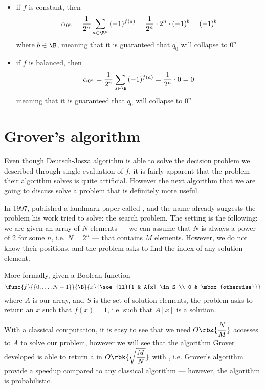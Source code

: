 \documentclass[a4paper, 12pt]{report}
\begin{document}
\begin{itemize}
    \item if $f$ is constant, then $$\alpha_{0^n} = \dfrac{1}{2^n} \sum_{a \in \B^n}{(-1)^{f(a)}} = \dfrac{1}{2^n} \cdot 2^n \cdot (-1)^{b} = (-1)^b$$ where $b \in \B$, meaning that it is guaranteed that $q_0$ will collapse to $0^n$
    \item if $f$ is balanced, then $$\alpha_{0^n} = \dfrac{1}{2^n} \sum_{a \in \B}{(-1)^{f(a)}} = \dfrac{1}{2^n} \cdot 0 = 0$$ meaning that it is guaranteed that $q_0$ will  collapse to $0^n$
\end{itemize}

\section{Grover's algorithm}

Even though Deutsch-Josza algorithm is able to solve the decision problem we described through  single evaluation of $f$, it is fairly apparent that the problem their algorithm solves is quite artificial. However the next algorithm that we are going to discuss solve a problem that is definitely more useful.

In 1997, \textcite{grover} published a landmark paper called , and the name already suggests the problem his work tried to solve: the search problem. The setting is the following: we are given an array of $N$ elements --- we can assume that $N$ is always a power of 2 for some $n$, i.e. $N= 2^n$ --- that contains $M$  elements. However, we do not know their positions, and the problem asks to find the index of any solution element.

More formally, given a Boolean function $$\func{f}{\{0, \ldots, N - 1\}}{\B}{x}{\soe{ll}{1 & A[x] \in S \\ 0 & \mbox{otherwise}}}$$ where $A$ is our array, and $S$ is the set of solution elements, the problem asks to return an $x$ such that $f(x) = 1$, i.e. such that $A[x]$ is a solution.

With a classical computation, it is easy to see that we need $O \rbk{\dfrac{N}{M}}$ accesses to $A$ to solve our problem, however we will see that the algorithm Grover developed is able to return a  in $O\rbk{\sqrt{\dfrac{M}{N}}}$ with , i.e. Grover's algorithm provide a  speedup compared to any classical algorithm --- however, the algorithm is probabilistic.
\end{document}

